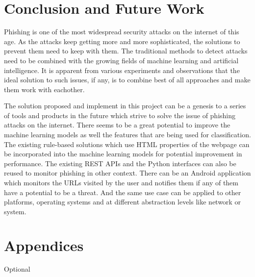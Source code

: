 \documentclass[conference]{IEEEtran}
\begin{document}
\section{Conclusion and Future Work}
\par Phishing is one of the most widespread security attacks on the internet of this age.
As the attacks keep getting more and more sophisticated, the solutions to prevent them need to keep with them.
The traditional methods to detect attacks need to be combined with the growing fields of machine learning and artificial intelligence.
It is apparent from various experiments and observations that the ideal solution to such issues, if any, is to combine best of all approaches and make them work with eachother.

\par The solution proposed and implement in this project can be a genesis to a series of tools and products in the future which strive to solve the issue of phishing attacks on the internet.
There seems to be a great potential to improve the machine learning models as well the features that are being used for classification.
The existing rule-based solutions which use HTML properties of the webpage can be incorporated into the machine learning models for potential improvement in performance.
The existing REST APIs and the Python interfaces can also be reused to monitor phishing in other context.
There can be an Android application which monitors the URLs visited by the user and notifies them if any of them have a potential to be a threat.
And the same use case can be applied to other platforms, operating systems and at different abstraction levels like network or system.

\section{Appendices}
Optional
\end{document}
